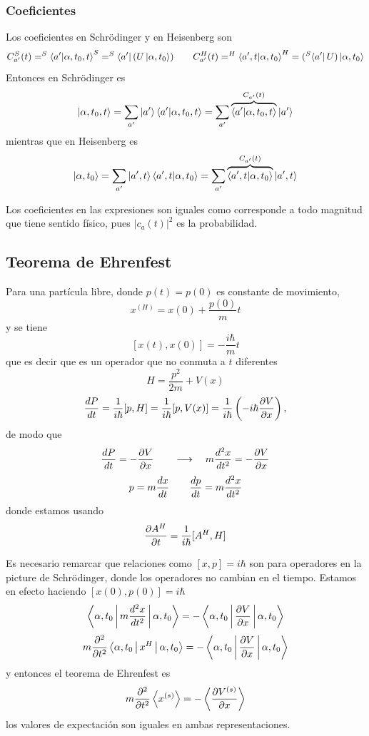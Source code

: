 \documentclass[10pt,oneside]{CBFT_book}
\begin{document}
\subsubsection{Coeficientes}

Los coeficientes en Schrödinger y en Heisenberg son 
\[
	C_{a'}^S(t) = ^S\braket{a'|\alpha,t_0,t}^S = ^S\Bra{a'}(U\Ket{\alpha,t_0}) \qquad 
	C_{a'}^H(t) = ^H\braket{a',t|\alpha,t_0}^H = (^S\Bra{a'}U)\Ket{\alpha,t_0}
\]
Entonces en Schrödinger es 
\[
	\Ket{\alpha,t_0,t} = \sum_{a'} \Ket{a'}\braket{a'|\alpha,t_0,t} = 
	\sum_{a'} \overbrace{\braket{a'|\alpha,t_0,t}}^{C_{a'}(t)}\Ket{a'}
\]
mientras que en Heisenberg es 
\[
	\Ket{\alpha,t_0} = \sum_{a'} \Ket{a',t}\braket{a',t|\alpha,t_0} = 
	\sum_{a'} \overbrace{\braket{a',t|\alpha,t_0}}^{C_{a'}(t)}\Ket{a',t}
\]

Los coeficientes en las expresiones son iguales como corresponde a todo magnitud que tiene sentido físico, pues 
$|c_a(t)|^2$ es la probabilidad.

\subsection{Teorema de Ehrenfest}

Para una partícula libre, donde $p(t)=p(0)$ es constante de movimiento,
\[
	x^{(H)} = x(0) + \frac{p(0)}{m}t
\]
y se tiene 
\[
	[x(t),x(0)] = -\frac{i\hbar}{m}t
\]
que es decir que es un operador que no conmuta a $t$ diferentes
\[
	H = \frac{p^2}{2m} + V(x)
\]
\[
	\dtot{P}{t} = \frac{1}{i\hbar}[p,H] = \frac{1}{i\hbar}[p,V(x)] = 
	\frac{1}{i\hbar}\left( -i\hbar\dpar{V}{x}\right),
\]
de modo que 
\[
	\dtot{P}{t} = -\dpar{V}{x} \qquad \longrightarrow \quad m \dtot[2]{x}{t} = -\dpar{V}{x} 
\]
\[
	p = m \dtot{x}{t} \qquad \dtot{p}{t} = m \dtot[2]{x}{t} 
\]
donde estamos usando 
\[
	\dpar{A^H}{t} = \frac{1}{i\hbar}[A^H,H]
\]

Es necesario remarcar que relaciones como $[x,p]=i\hbar$ son para operadores en la picture de Schrödinger, donde los 
operadores no cambian en el tiempo. Estamos en efecto haciendo $[x(0),p(0)]=i\hbar$
\[
	\Braket{\alpha,t_0|m \dtot[2]{x}{t}|\alpha,t_0} = - \Braket{\alpha,t_0|\dpar{V}{x}|\alpha,t_0}
\]
\[
	m\dpar[2]{}{t}\Braket{\alpha,t_0| x^H |\alpha,t_0} = -\Braket{\alpha,t_0|\dpar{V}{x}|\alpha,t_0}
\]
y entonces el teorema de Ehrenfest es 
\[
	m \dpar[2]{}{t} \Braket{x^{(s)}} = - \Braket{ \dpar{V^{(s)}}{x}}
\]
los valores de expectación son iguales en ambas representaciones.







\end{document}
